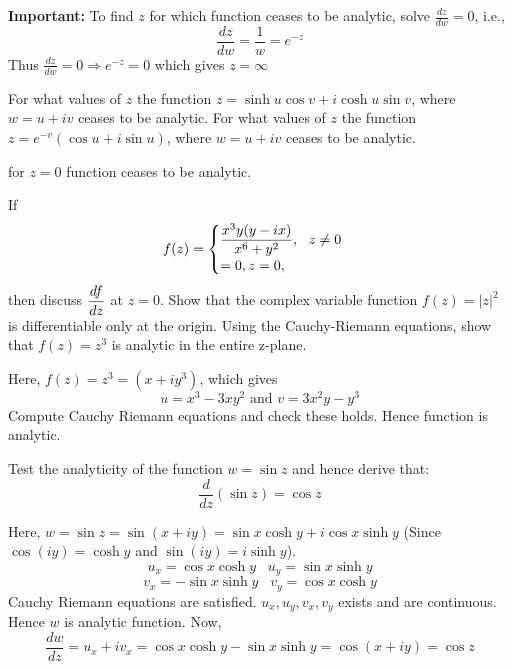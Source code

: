 \begin{problems}
\begin{sol}
\textbf{Important: } To find $z$ for which function ceases to be analytic, solve $\frac{dz}{dw}=0$, i.e.,
\[\frac{dz}{dw} = \frac{1}{w} = e^{-z} \]
Thus $\frac{dz}{dw} = 0  \Rightarrow  e^{-z} =0$
which gives $z=\infty$
\end{sol}
\prob For what values of $z$ the function $z=\sinh u\cos v + i\cosh u \sin v$, where $w=u+iv$ ceases to be analytic.
\prob For what values of $z$ the function $z=e^{-v}(\cos u + i \sin u)$, where $w=u+iv$ ceases to be analytic.
\begin{sol}
for $z=0$ function ceases to be analytic.
\end{sol}
\prob If 
\[
f(z)=
\begin{cases}
\displaystyle \frac{x^3y(y-ix)}{x^6+y^2},~~ z \neq 0 \\
=0, z=0,
\end{cases}
\]
then discuss $\displaystyle \frac{df}{dz}$ at $z=0$. 
\prob Show that the complex variable function $f(z)=|z|^2$ is differentiable only at the origin. 
\prob Using the Cauchy-Riemann equations, show that $f(z)=z^3$ is analytic in the entire z-plane. 
\begin{sol}
Here, $f(z) = z^3 = (x+iy^3)$, which gives
\[u=x^3-3xy^2 \text{ and } v=3x^2y-y^3\]
Compute Cauchy Riemann equations and check these holds. Hence function is analytic.
\end{sol}
\prob Test the analyticity of the function $w= \sin z$ and hence derive that: 
\[\frac{d}{dz}(\sin z) = \cos z\]
\begin{sol}
Here, $w=\sin z = \sin(x+iy) = \sin x \cosh y + i \cos x \sinh y$ (Since $\cos (iy) = \cosh y$ and $\sin (iy) = i \sinh y$).
\[u_x=\cos x \cosh y\;\;\;u_y=\sin x \sinh y\]
\[v_x= - \sin x \sinh y\;\;\; v_y=\cos x \cosh y\]
Cauchy Riemann equations are satisfied. $u_x,u_y,v_x,v_y$ exists and are continuous. Hence $w$ is analytic  function.
Now,
\[\frac{dw}{dz}=u_x+iv_x =\cos x \cosh y-\sin x \sinh y = \cos (x+iy) = \cos z\]
\end{sol}


\end{problems}

